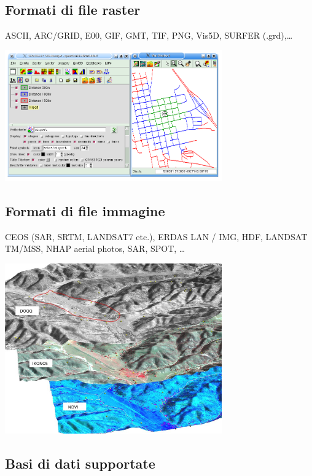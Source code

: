 \documentclass[notumble,a4paper,10pt,nofoldmark]{leaflet}
\newenvironment{myfig}[1][0pt plus 1.5ex minus .5ex]{\par\vspace*{#1}\begin{minipage}{\textwidth}\centering}{\end{minipage}}
\begin{document}
\subsection{Formati di file raster}
ASCII, ARC/GRID, E00, GIF, GMT, TIF, PNG, Vis5D, SURFER (.grd),\dots
\begin{myfig}
\includegraphics[width=0.7\textwidth]{isodist}
\end{myfig}

\subsection{Formati di file immagine}

CEOS (SAR, SRTM, LANDSAT7 etc.), ERDAS LAN / IMG, HDF, LANDSAT TM/MSS, NHAP aerial photos, SAR, SPOT, \dots
\begin{myfig}[1.5ex]
\includegraphics[width=0.7\textwidth]{ndvi}
\end{myfig}

\subsection{Basi di dati supportate}
\end{document}
